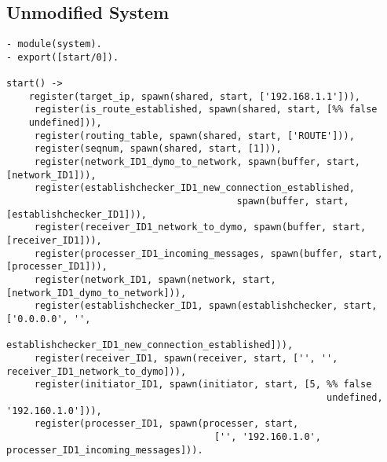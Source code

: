 \subsection*{Unmodified System}

\footnotesize
\begin{verbatim}
- module(system).
- export([start/0]).

start() -> 
    register(target_ip, spawn(shared, start, ['192.168.1.1'])),
     register(is_route_established, spawn(shared, start, [%% false
    undefined])),
     register(routing_table, spawn(shared, start, ['ROUTE'])),
     register(seqnum, spawn(shared, start, [1])),
     register(network_ID1_dymo_to_network, spawn(buffer, start, [network_ID1])),
     register(establishchecker_ID1_new_connection_established, 
                                         spawn(buffer, start, [establishchecker_ID1])),
     register(receiver_ID1_network_to_dymo, spawn(buffer, start, [receiver_ID1])),
     register(processer_ID1_incoming_messages, spawn(buffer, start, [processer_ID1])),
     register(network_ID1, spawn(network, start, [network_ID1_dymo_to_network])),
     register(establishchecker_ID1, spawn(establishchecker, start, ['0.0.0.0', '',
                                          establishchecker_ID1_new_connection_established])),
     register(receiver_ID1, spawn(receiver, start, ['', '', receiver_ID1_network_to_dymo])),
     register(initiator_ID1, spawn(initiator, start, [5, %% false
                                                         undefined, '192.160.1.0'])),
     register(processer_ID1, spawn(processer, start, 
                                     ['', '192.160.1.0', processer_ID1_incoming_messages])).
\end{verbatim}
\normalsize